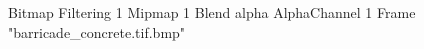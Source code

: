 {Bitmap
	{Filtering 1}
	{Mipmap 1}
	{Blend alpha}
	{AlphaChannel 1}
	{Frame "barricade_concrete.tif.bmp"}
}
